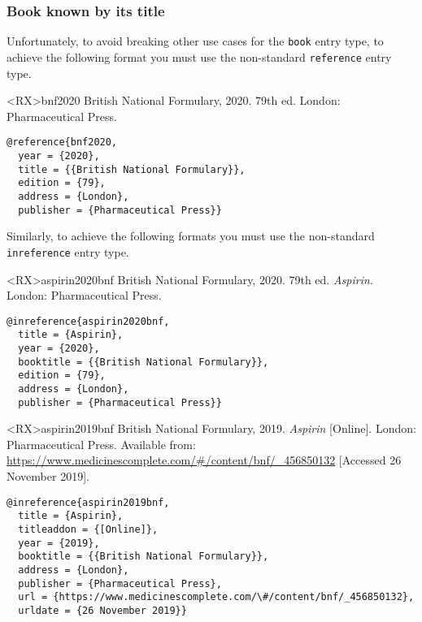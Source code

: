 \documentclass[10pt,a4paper]{article}
\newenvironment{info}{%
  \begin{list}{\makebox[2em][c]{\faInfoCircle}}{%
    \setlength{\leftmargin}{2em}
    \setlength{\labelwidth}{2em}
    \setlength{\labelsep}{0pt}}
}{\end{list}}
\begin{document}
\subsubsection*{Book known by its title}

\begin{info}\item
Unfortunately, to avoid breaking other use cases for the \texttt{book} entry
type, to achieve the following format you must use the non-standard
\texttt{reference} entry type.
\end{info}

\begin{bibexbox}<RX>{bnf2020}
  British National Formulary, 2020. 79th ed. London: Pharmaceutical Press.
  \tcblower
\begin{Verbatim}
@reference{bnf2020,
  year = {2020},
  title = {{British National Formulary}},
  edition = {79},
  address = {London},
  publisher = {Pharmaceutical Press}}
\end{Verbatim}
\end{bibexbox}

\begin{info}\item
Similarly, to achieve the following formats you must use the non-standard
\texttt{inreference} entry type.
\end{info}

\begin{bibexbox}<RX>{aspirin2020bnf}
  British National Formulary, 2020. 79th ed. \emph{Aspirin}. London: Pharmaceutical Press.
  \tcblower
\begin{Verbatim}
@inreference{aspirin2020bnf,
  title = {Aspirin},
  year = {2020},
  booktitle = {{British National Formulary}},
  edition = {79},
  address = {London},
  publisher = {Pharmaceutical Press}}
\end{Verbatim}
\end{bibexbox}

\begin{bibexbox}<RX>{aspirin2019bnf}
  British National Formulary, 2019. \emph{Aspirin} [Online]. London: Pharmaceutical Press. Available from: \url{https://www.medicinescomplete.com/#/content/bnf/_456850132} [Accessed 26 November 2019].
  \tcblower
\begin{Verbatim}
@inreference{aspirin2019bnf,
  title = {Aspirin},
  titleaddon = {[Online]},
  year = {2019},
  booktitle = {{British National Formulary}},
  address = {London},
  publisher = {Pharmaceutical Press},
  url = {https://www.medicinescomplete.com/\#/content/bnf/_456850132},
  urldate = {26 November 2019}}
\end{Verbatim}
\end{bibexbox}
\end{document}
